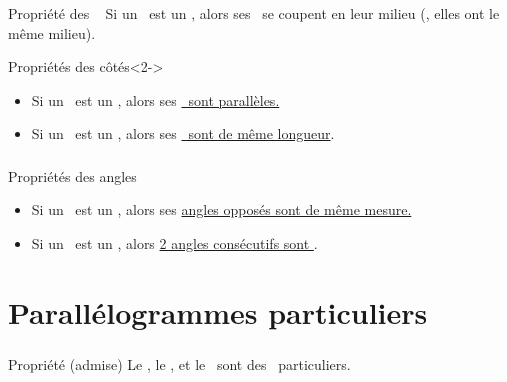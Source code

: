 \documentclass{beamer}
\begin{document}
\begin{frame}
	\frametitle{}  
	\framesubtitle{}	
	
	\begin{alertblock}{Propriété des \diags\ }
		Si un \myquad\ est un \para , alors ses \diags\ se coupent en leur milieu (\cad , elles ont le même milieu).
	\end{alertblock}
	
	\begin{alertblock}{Propriétés des côtés}<2->
		\begin{itemize}
			\item Si un \myquad\ est un \para , alors ses \underline{\co\ sont parallèles.}
			\item Si un \myquad\ est un \para , alors ses \underline{\co\ sont de même longueur}.
		\end{itemize}
	\end{alertblock}
	
\end{frame}




\begin{frame}
	\frametitle{}  
	\framesubtitle{}

	\begin{alertblock}{Propriétés des angles}
		\begin{itemize}
			\item Si un \myquad\ est un \para , alors ses \underline{angles opposés sont de même mesure.}
			\item Si un \myquad\ est un \para , alors \underline{2 angles consécutifs sont \supp}.
		\end{itemize}
	\end{alertblock}
		
	
	
\end{frame}



\section{Parallélogrammes particuliers}

\begin{frame}
	\frametitle{}
\end{frame} 

\begin{frame}
	\frametitle{}  
	\framesubtitle{}	
	
	\begin{alertblock}{Propriété (admise)}
		Le \rect , le \los , et le \car\ sont des \paras\ particuliers.
	\end{alertblock}
	
\end{frame}
\end{document}
